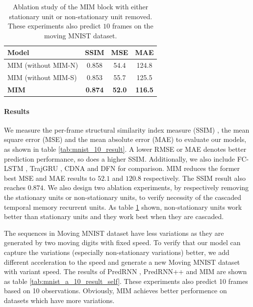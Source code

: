 \documentclass[10pt,twocolumn,letterpaper]{article}
\begin{document}
\begin{table}[h]
  \caption{Ablation study of the MIM block with either stationary unit or non-stationary unit removed. These experiments also predict $10$ frames on the moving MNIST dataset.}
  \label{tab:mnist_10_result_self}
  \vskip 0.15in
  \centering
  \begin{small}
  \begin{sc}
  \renewcommand{\multirowsetup}{\centering}  
  \begin{tabular}{lccc}
    \toprule
    Model & SSIM & MSE & MAE\\
    \midrule
    MIM (without MIM-N) & 0.858 & 54.4 & 124.8 \\
    MIM (without MIM-S) & 0.853 & 55.7 & 125.5 \\
    \midrule
    \textbf{MIM} & \textbf{0.874} & \textbf{52.0} & \textbf{116.5} \\
    \bottomrule
  \end{tabular}
  \end{sc}
  \end{small}
\end{table}

\paragraph{Results} We measure the per-frame structural similarity index measure (SSIM) \citep{Wang2004Image}, the mean square error (MSE) and the mean absolute error (MAE) to evaluate our models, as shown in table \ref{tab:mnist_10_result}. A lower RMSE or MAE denotes better prediction performance, so does a higher SSIM. Additionally, we also include FC-LSTM \citep{srivastava2015unsupervised}, TrajGRU \citep{shi2017deep}, CDNA \citep{Finn2016Unsupervised} and DFN \citep{de2016dynamic} for comparison. MIM reduces the former best MSE and MAE results to $52.1$ and $120.8$ respectively. The SSIM result also reaches $0.874$. We also design two ablation experiments, by respectively removing the stationary units or non-stationary units, to verify necessity of the cascaded temporal memory recurrent units. As table \ref{tab:mnist_10_result_self} shown, non-stationary units work better than stationary units and they work best when they are cascaded.

The sequences in Moving MNIST dataset have less variations as they are generated by two moving digits with fixed speed. To verify that our model can capture the variations (especially non-stationary variations) better, we add different acceleration to the speed and generate a new Moving MNIST dataset with variant speed. The results of PredRNN \citep{wang2017predrnn}, PredRNN++ \citep{wang2018predrnn++} and MIM are shown as table \ref{tab:mnist_a_10_result_self}. These experiments also predict 10 frames based on 10 observations. Obviously, MIM achieves better performence on datasets which have more variations.
\end{document}
